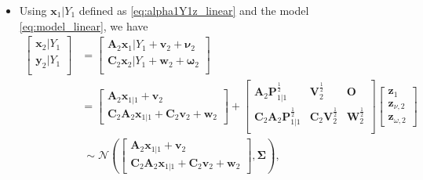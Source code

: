 \documentclass[12pt,a4paper]{article}
\begin{document}
\begin{itemize}
\begin{itemize}
    \begin{itemize}

    \item
      Using $\bm{x}_{1}|Y_{1}$ defined as \eqref{eq:alpha1Y1z_linear} and the model \eqref{eq:model_linear},
      we have
      \begin{align}
        \begin{bmatrix}
          \bm{x}_{2}|Y_{1}\\
          \bm{y}_{2}|Y_{1}\\
        \end{bmatrix}
        & =
          \begin{bmatrix}
            \bm{A}_{2}\bm{x}_{1}|Y_{1} + \bm{v}_{2} + \bm{\nu}_{2}\\
            \bm{C}_{2}\bm{x}_{2}|Y_{1} + \bm{w}_{2} + \bm{\omega}_{2}\\
          \end{bmatrix}
          \nonumber \\
        & =
          \begin{bmatrix}
            \bm{A}_{2}\bm{x}_{1|1} + \bm{v}_{2}\\
            \bm{C}_{2}\bm{A}_{2}\bm{x}_{1|1} + \bm{C}_{2}\bm{v}_{2} + \bm{w}_{2}
          \end{bmatrix}
          +
          \begin{bmatrix}
            \bm{A}_{2}\bm{P}_{1|1}^{\frac{1}{2}} & \bm{V}_{2}^{\frac{1}{2}} & \bm{O} \\
            \bm{C}_{2}\bm{A}_{2}\bm{P}_{1|1}^{\frac{1}{2}} & \bm{C}_{2}\bm{V}_{2}^{\frac{1}{2}} & \bm{W}_{2}^{\frac{1}{2}}\\
          \end{bmatrix}
          \begin{bmatrix}
            \bm{z}_{1}\\
            \bm{z}_{\nu,2}\\
            \bm{z}_{\omega,2}
          \end{bmatrix}
          \nonumber \\
          & ~ \sim
          \mathcal{N} \left(
          \begin{bmatrix}
            \bm{A}_{2}\bm{x}_{1|1} + \bm{v}_{2}\\
            \bm{C}_{2}\bm{A}_{2}\bm{x}_{1|1} + \bm{C}_{2}\bm{v}_{2} + \bm{w}_{2}
          \end{bmatrix},
          \bm{\Sigma}
          \right),
          \label{eq:alpha2y2Y1_linear}%
      \end{align}

\end{itemize}
\end{itemize}
\end{itemize}
\end{document}
